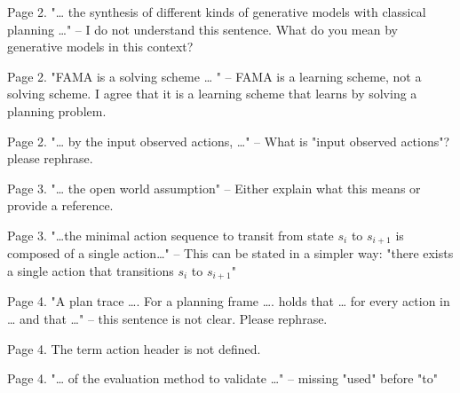 \documentclass{article}
\begin{document}
\begin{mdframed}[hidealllines=true,backgroundcolor=gray!20]
      Page 2. "… the synthesis of different kinds of generative models with classical planning …" – I do not understand this sentence. What do you mean by generative models in this context?
\end{mdframed}

\begin{mdframed}[hidealllines=true,backgroundcolor=gray!20]
      Page 2. "FAMA is a solving scheme … " – FAMA is a learning scheme, not a solving scheme. I agree that it is a learning scheme that learns by solving a planning problem.
\end{mdframed}

\begin{mdframed}[hidealllines=true,backgroundcolor=gray!20]
      Page 2. "… by the input observed actions, …" – What is "input observed actions"? please rephrase.
\end{mdframed}

\begin{mdframed}[hidealllines=true,backgroundcolor=gray!20]
      Page 3. "… the open world assumption" – Either explain what this means or provide a reference.
\end{mdframed}

\begin{mdframed}[hidealllines=true,backgroundcolor=gray!20]
      Page 3. "…the minimal action sequence to transit from state $s_i$ to $s_{i+1}$ is composed of a single action…" – This can be stated in a simpler way: "there exists a single action that transitions $s_i$ to $s_{i+1}$"
\end{mdframed}


\begin{mdframed}[hidealllines=true,backgroundcolor=gray!20]
      Page 4. "A plan trace …. For a planning frame …. holds that … for every action in  … and that …" – this sentence is not clear. Please rephrase.
\end{mdframed}


\begin{mdframed}[hidealllines=true,backgroundcolor=gray!20]
      Page 4. The term action header is not defined.
\end{mdframed}


\begin{mdframed}[hidealllines=true,backgroundcolor=gray!20]
      Page 4. "… of the evaluation method to validate …" – missing "used" before "to"
\end{mdframed}
\end{document}
